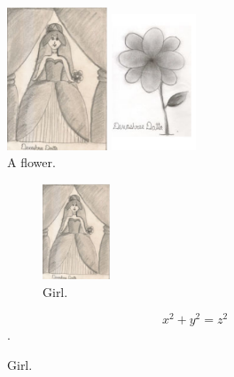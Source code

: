 \documentclass{article}
\begin{document}
\begin{figure}[!hbt]
    \begin{minipage}[c]{0.4\linewidth}
        \centering
        \includegraphics[width=3.0cm]{girl}
        \caption{A girl.}
        \label{girl}
    \end{minipage}\hfill
    \begin{minipage}[c]{0.4\linewidth}
        \centering
        \includegraphics[width=2.5cm]{flower}
        \caption{A flower.}
        \label{flower}
    \end{minipage}
\end{figure}


\begin{figure}[!hbt]
    \begin{figure}
        \includegraphics[width=2.0cm]{girl}
        \caption{Girl.}
        \label{girl}
    \end{figure}
    \lipsum[1]
    $$x^2 + y^2 = z^2$$.
\end{figure}
\end{document}
